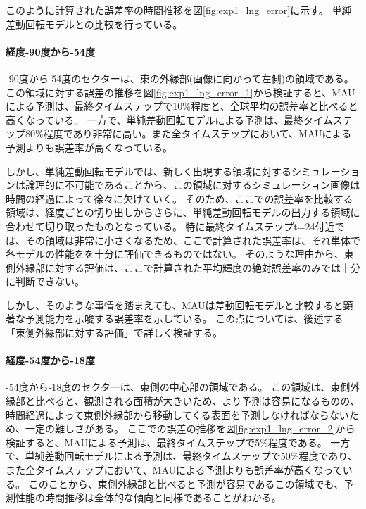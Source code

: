           このように計算された誤差率の時間推移を図\ref{fig:exp1_lng_error}に示す。
          単純差動回転モデルとの比較を行っている。
          
          \paragraph{経度-90度から-54度}
          -90度から-54度のセクターは、東の外縁部(画像に向かって左側)の領域である。
          この領域に対する誤差の推移を図\ref{fig:exp1_lng_error_1}から検証すると、MAUによる予測は、最終タイムステップで10\%程度と、全球平均の誤差率と比べると高くなっている。
          一方で、単純差動回転モデルによる予測は、最終タイムステップ80\%程度であり非常に高い。また全タイムステップにおいて、MAUによる予測よりも誤差率が高くなっている。

          しかし、単純差動回転モデルでは、新しく出現する領域に対するシミュレーションは論理的に不可能であることから、この領域に対するシミュレーション画像は時間の経過によって徐々に欠けていく。
          そのため、ここでの誤差率を比較する領域は、経度ごとの切り出しからさらに、単純差動回転モデルの出力する領域に合わせて切り取ったものとなっている。
          特に最終タイムステップt=24付近では、その領域は非常に小さくなるため、ここで計算された誤差率は、それ単体で各モデルの性能をを十分に評価できるものではない。
          そのような理由から、東側外縁部に対する評価は、ここで計算された平均輝度の絶対誤差率のみでは十分に判断できない。
          
          しかし、そのような事情を踏まえても、MAUは差動回転モデルと比較すると顕著な予測能力を示唆する誤差率を示している。
          この点については、後述する「東側外縁部に対する評価」で詳しく検証する。

          \paragraph{経度-54度から-18度}
          -54度から-18度のセクターは、東側の中心部の領域である。
          この領域は、東側外縁部と比べると、観測される面積が大きいため、より予測は容易になるものの、時間経過によって東側外縁部から移動してくる表面を予測しなければならないため、一定の難しさがある。
          ここでの誤差の推移を図\ref{fig:exp1_lng_error_2}から検証すると、MAUによる予測は、最終タイムステップで5\%程度である。
          一方で、単純差動回転モデルによる予測は、最終タイムステップで50\%程度であり、また全タイムステップにおいて、MAUによる予測よりも誤差率が高くなっている。
          このことから、東側外縁部と比べると予測が容易であるこの領域でも、予測性能の時間推移は全体的な傾向と同様であることがわかる。

